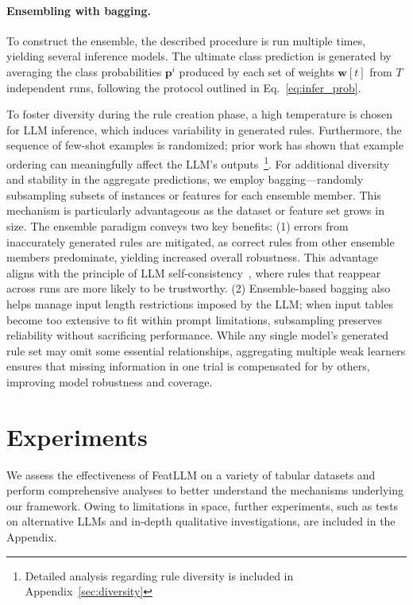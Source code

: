 \vspace*{-0.12in}
\paragraph{Ensembling with bagging.} To construct the ensemble, the described procedure is run multiple times, yielding several inference models. The ultimate class prediction is generated by averaging the class probabilities $\mathbf{p}^i$ produced by each set of weights $\mathbf{w}[t]$ from $T$ independent runs, following the protocol outlined in Eq.~\ref{eq:infer_prob}.

To foster diversity during the rule creation phase, a high temperature is chosen for LLM inference, which induces variability in generated rules. Furthermore, the sequence of few-shot examples is randomized; prior work has shown that example ordering can meaningfully affect the LLM's outputs~\cite{lu2022fantastically}\footnote{Detailed analysis regarding rule diversity is included in Appendix~\ref{sec:diversity}}. For additional diversity and stability in the aggregate predictions, we employ bagging—randomly subsampling subsets of instances or features for each ensemble member. This mechanism is particularly advantageous as the dataset or feature set grows in size. The ensemble paradigm conveys two key benefits: (1) errors from inaccurately generated rules are mitigated, as correct rules from other ensemble members predominate, yielding increased overall robustness. This advantage aligns with the principle of LLM self-consistency~\cite{wang2022self}, where rules that reappear across runs are more likely to be trustworthy. (2) Ensemble-based bagging also helps manage input length restrictions imposed by the LLM; when input tables become too extensive to fit within prompt limitations, subsampling preserves reliability without sacrificing performance. While any single model's generated rule set may omit some essential relationships, aggregating multiple weak learners ensures that missing information in one trial is compensated for by others, improving model robustness and coverage.

\section{Experiments}
We assess the effectiveness of \textsf{FeatLLM} on a variety of tabular datasets and perform comprehensive analyses to better understand the mechanisms underlying our framework. Owing to limitations in space, further experiments, such as tests on alternative LLMs and in-depth qualitative investigations, are included in the Appendix.

